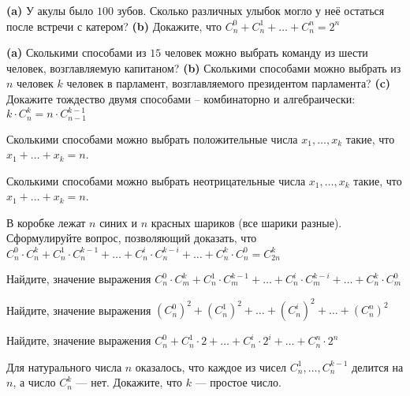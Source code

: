 \documentclass{article}
\begin{document}
\begin{enumerate_boxed}
        \item \textbf{(a)} У акулы было $100$ зубов.
        Сколько различных улыбок могло у неё остаться после встречи
        с катером? \textbf{(b)} Докажите, что $C^0_n + C^1_n + \dotsc + C^n_n = 2^n$

        \item \textbf{(a)} Сколькими способами из $15$ человек можно выбрать команду из шести человек, возглавляемую капитаном? \textbf{(b)} Сколькими способами можно выбрать из $n$ человек $k$ человек в парламент, возглавляемого президентом парламента? \textbf{(c)} Докажите тождество двумя способами – комбинаторно и алгебраически: $k \cdot C^k_n = n \cdot C^{k-1}_{n-1}$

        \item Сколькими способами можно выбрать положительные числа $x_1, \dotso , x_k$ такие, что $x_1 + \dotso + x_k = n$.

        \item Сколькими способами можно выбрать неотрицательные числа $x_1, \dotso , x_k$ такие, что $x_1 + \dotso + x_k = n$.

        \item В коробке лежат $n$ синих и $n$ красных шариков (все шарики разные).
        Сформулируйте
        вопрос, позволяющий доказать, что $C^0_n \cdot C^k_n +C^1_n \cdot C^{k-1}_n+\dotso+C^i_n \cdot C^{k-i}_n +\dotso + C^k_n \cdot C^0_n =C^k_{2n}$

        \item Найдите, значение выражения $C^0_n \cdot C^k_m +C^1_n \cdot C^{k-1}_m+\dotso+C^i_n \cdot C^{k-i}_m +\dotso + C^k_n \cdot C^0_m$

        \item Найдите, значение выражения $(C^0_n)^2 +(C^1_n)^2 +\dotso+(C^i_n)^2 +\dotso + (C^n_n)^2$

        \item Найдите, значение выражения $C^0_n +C^1_n \cdot 2 +\dotso+C^i_n \cdot 2^i +\dotso + C^n_n \cdot 2^n$

        \item Для натурального числа $n$ оказалось, что каждое из чисел $C^1_n, \dotsc, C^{k - 1}_n$
        делится на $n$, а число $C^k_n$ — нет.
        Докажите, что $k$ — простое число.

    \end{enumerate_boxed}
\end{document}
